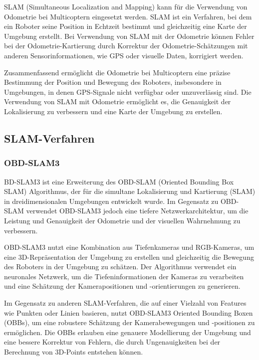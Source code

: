 SLAM (Simultaneous Localization and Mapping) kann für die Verwendung von Odometrie bei Multicoptern eingesetzt werden. SLAM ist ein Verfahren, bei dem ein Roboter seine Position in Echtzeit bestimmt und gleichzeitig eine Karte der Umgebung erstellt. Bei Verwendung von SLAM mit der Odometrie können Fehler bei der Odometrie-Kartierung durch Korrektur der Odometrie-Schätzungen mit anderen Sensorinformationen, wie GPS oder visuelle Daten, korrigiert werden.

Zusammenfassend ermöglicht die Odometrie bei Multicoptern eine präzise Bestimmung der Position und Bewegung des Roboters, insbesondere in Umgebungen, in denen GPS-Signale nicht verfügbar oder unzuverlässig sind. Die Verwendung von SLAM mit Odometrie ermöglicht es, die Genauigkeit der Lokalisierung zu verbessern und eine Karte der Umgebung zu erstellen.

\subsection{SLAM-Verfahren}

\subsubsection{OBD-SLAM3}

BD-SLAM3 ist eine Erweiterung des OBD-SLAM (Oriented Bounding Box SLAM) Algorithmus, der für die simultane Lokalisierung und Kartierung (SLAM) in dreidimensionalen Umgebungen entwickelt wurde. Im Gegensatz zu OBD-SLAM verwendet OBD-SLAM3 jedoch eine tiefere Netzwerkarchitektur, um die Leistung und Genauigkeit der Odometrie und der visuellen Wahrnehmung zu verbessern.

OBD-SLAM3 nutzt eine Kombination aus Tiefenkameras und RGB-Kameras, um eine 3D-Repräsentation der Umgebung zu erstellen und gleichzeitig die Bewegung des Roboters in der Umgebung zu schätzen. Der Algorithmus verwendet ein neuronales Netzwerk, um die Tiefeninformationen der Kameras zu verarbeiten und eine Schätzung der Kamerapositionen und -orientierungen zu generieren.

Im Gegensatz zu anderen SLAM-Verfahren, die auf einer Vielzahl von Features wie Punkten oder Linien basieren, nutzt OBD-SLAM3 Oriented Bounding Boxen (OBBs), um eine robustere Schätzung der Kamerabewegungen und -positionen zu ermöglichen. Die OBBs erlauben eine genauere Modellierung der Umgebung und eine bessere Korrektur von Fehlern, die durch Ungenauigkeiten bei der Berechnung von 3D-Points entstehen können.

